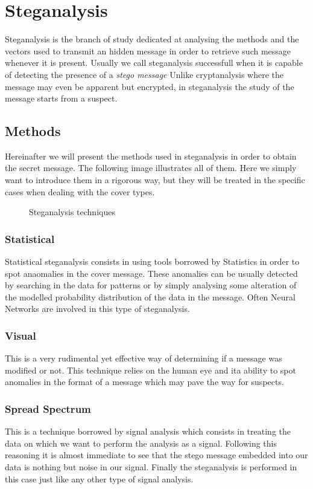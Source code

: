 \documentclass[../../main.tex]{subfiles}
\begin{document}
    
    \section{Steganalysis}
    Steganalysis is the branch of study dedicated at analysing the methods and
    the vectors used to transmit an hidden message in order to retrieve such
    message whenever it is present. Usually we call steganalysis successfull when it is capable of detecting the presence of a \emph{stego message}
    Unlike cryptanalysis where the message may even be apparent but encrypted,
    in steganalysis the study of the message starts from a suspect.
    \subsection{Methods}
    Hereinafter we will present the methods used in steganalysis in
    order to obtain the secret message. The following image illustrates all of
    them. Here we simply want to introduce them in a rigorous way, but they will
    be treated in the specific cases when dealing with the cover types.

    \begin{figure}[h]
        \centering
        \caption{Steganalysis techniques}
    \end{figure}


    \subsubsection{Statistical}
    Statistical steganalysis consists in using tools borrowed by Statistics in
    order to spot anaomalies in the cover message. These anomalies can be
    usually detected by searching in the data for patterns or by simply
    analysing some alteration of the modelled probability distribution of the
    data in the message. Often Neural Networks are involved in this type of
    steganalysis.

    \subsubsection{Visual}
    This is a very rudimental yet effective way of determining if a message was
    modified or not. This technique relies on the human eye and ita ability to
    spot anomalies in the format of a message which may pave the way for
    suspects.
    
    \subsubsection{Spread Spectrum}
    This is a technique borrowed by signal analysis which consists in treating
    the data on which we want to perform the analysis as a signal. Following
    this reasoning it is almost immediate to see that the stego message embedded
    into our data is nothing but noise in our signal. Finally the steganalysis
    is performed in this case just like any other type of signal analysis.
\end{document}
